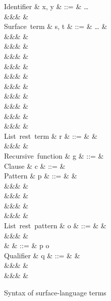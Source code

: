 \begin{figure}[H]
\begin{syntaxfig}
\mbox{Identifier}
&
x, y
&
::=
&
\ldots
\\
&&&
\primOp
&
\\
\mbox{Surface term}
&
s, t
&
::=
&
\ldots
&
\\
&&&
\exOp{\primOp}
&
\\
&&&
&
\\
&&&
&
\\
&&&
&
\\
&&&
&
\\
&&&
&
\\
&&&
&
\\
&&&
&
\\
&&&
&
\\
&&&
&
\\[2mm]

\mbox{List rest term}
&
r
&
::=
&
\annListEnd{\alpha}
&
\\
&&&
&
\\[2mm]

\mbox{Recursive function}
&
g
&
::=
&
\\[2mm]

\mbox{Clause}
&
c
&
::=
&
\\[2mm]

\mbox{Pattern}
&
p
&
::=
&
&
\\
&&&
\pattNil
&
\\
&&&
&
\\
&&&
&
\\
&&&
&
\\[2mm]

\mbox{List rest pattern}
&
o
&
::=
&
\pattListEnd
&
\\
&&&
&
\\[2mm]

&
\pi
&
::=
&
p \mid o
\\[2mm]

\mbox{Qualifier}
&
q
&
::=
&
&
\\
&&&
&
\\
&&&
&
\end{syntaxfig}
\caption{Syntax of surface-language terms}
\end{figure}
